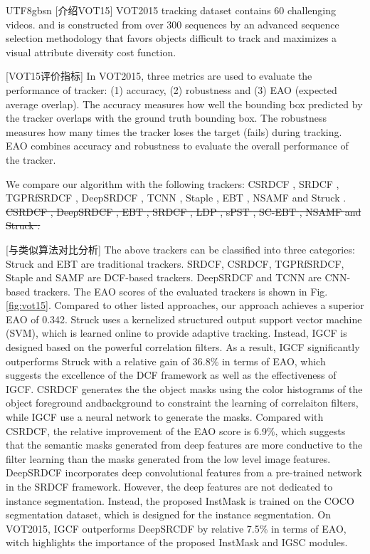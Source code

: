 \documentclass[review]{elsarticle}
\begin{document}
\begin{CJK*}{UTF8}{gbsn}
[介绍VOT15] VOT2015 \cite{Kristan2015TheVO} tracking dataset contains 60 challenging videos. and is constructed from over 300 sequences by an advanced sequence selection methodology that favors objects difficult to track and maximizes a visual attribute diversity cost function. 

[VOT15评价指标] In VOT2015, three metrics are used to evaluate the performance of  tracker: (1) accuracy, (2) robustness and (3) EAO (expected average overlap). The accuracy measures how well the bounding box predicted by the tracker overlaps with the ground truth bounding box. The robustness measures how many times the tracker loses the target (fails) during tracking. EAO combines accuracy and robustness to evaluate the overall performance of the tracker. 

We compare our algorithm with the following trackers: CSRDCF \cite{Lukezic2017DiscriminativeCF}, SRDCF \cite{Danelljan2015LearningSR}, TGPRfSRDCF \cite{gao2018tracking}, DeepSRDCF \cite{Danelljan2015ConvolutionalFF}, TCNN \cite{nam2016modeling}, Staple \cite{Bertinetto2016StapleC}, EBT \cite{Zhu2016BeyondLS},  NSAMF \cite{Hua2015OnlineOT} and Struck \cite{Hare2011StruckSO}.
\sout{CSRDCF \cite{Lukezic2017DiscriminativeCF}, DeepSRDCF \cite{Danelljan2015ConvolutionalFF}, EBT \cite{Zhu2016BeyondLS}, SRDCF \cite{Danelljan2015LearningSR}, LDP \cite{Kristan2015TheVO}, sPST \cite{Hua2015OnlineOT}, SC-EBT \cite{Hua2015OnlineOT}, NSAMF \cite{Hua2015OnlineOT} and Struck \cite{Hare2011StruckSO}.} 


[与类似算法对比分析] The above trackers can be classified into three categories: Struck and EBT are traditional trackers. SRDCF, CSRDCF, TGPRfSRDCF, Staple and SAMF are DCF-based trackers. DeepSRDCF and TCNN are CNN-based trackers.
The EAO scores of the evaluated trackers is shown in Fig. \ref{fig:vot15}. Compared to other listed approaches, our approach achieves a superior EAO of 0.342. 
Struck uses a kernelized structured output support vector machine (SVM), which is learned online to provide adaptive tracking. Instead, IGCF is designed based on the powerful correlation filters. As a result, IGCF significantly outperforms Struck with a relative gain of 36.8\% in terms of EAO, which suggests the excellence of the DCF framework as well as the effectiveness of IGCF.
CSRDCF generates the the object masks using the color histograms of the object foreground andbackground to constraint the learning of correlaiton filters, while IGCF use a neural network to generate the masks. Compared with CSRDCF, the relative improvement of the EAO score is 6.9\%, which suggests that the semantic masks generated from deep features are more conductive to the filter learning than the masks generated from the low level image features.
DeepSRDCF incorporates deep convolutional features from a pre-trained network in the SRDCF framework. However, the deep features are not dedicated to instance segmentation. Instead, the proposed InstMask is trained on the COCO segmentation dataset, which is designed for the instance segmentation. On VOT2015, IGCF outperforms DeepSRCDF by relative 7.5\% in terms of EAO, witch highlights the importance of the proposed InstMask and IGSC modules.


\end{CJK*}
\end{document}

